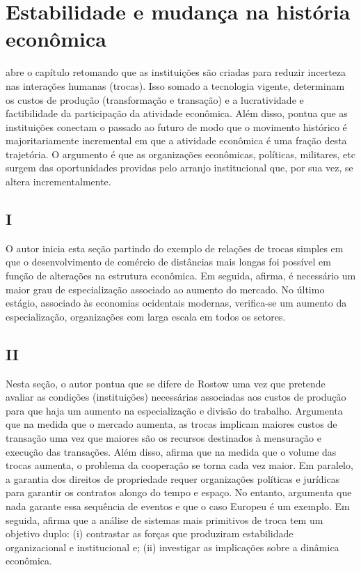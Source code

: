 \section*{Estabilidade e mudança na história econômica}

\autor abre o capítulo retomando que as instituições são criadas para reduzir incerteza nas interações humanas (trocas). Isso somado a tecnologia vigente, determinam os custos de produção (transformação e transação) e a lucratividade e factibilidade da participação da atividade econômica. Além disso, pontua que as instituições conectam o passado ao futuro de modo que o movimento histórico é majoritariamente incremental em que a atividade econômica é uma fração desta trajetória. O argumento é que as organizações econômicas, políticas, militares, etc surgem das oportunidades providas pelo arranjo institucional que, por sua vez, se altera incrementalmente.

\subsection*{I}

O autor inicia esta seção partindo do exemplo de relações de trocas simples em que o desenvolvimento de comércio de distâncias mais longas foi possível em função de alterações na estrutura econômica. Em seguida, afirma, é necessário um maior grau de especialização associado ao aumento do mercado. No último estágio, associado às economias ocidentais modernas, verifica-se um aumento da especialização, organizações com larga escala em todos os setores.

\subsection*{II}

Nesta seção, o autor pontua que se difere de Rostow uma vez que pretende avaliar as condições (instituições) necessárias associadas aos custos de produção para que haja um aumento na especialização e divisão do trabalho. Argumenta que na medida que o mercado aumenta, as trocas implicam maiores custos de transação uma vez que maiores são os recursos destinados à mensuração e execução das transações. Além disso, afirma que na medida que o volume das trocas aumenta, o problema da cooperação se torna cada vez maior. Em paralelo, a garantia dos direitos de propriedade requer organizações políticas e jurídicas para garantir os contratos alongo do tempo e espaço.
No entanto, argumenta que nada garante essa sequência de eventos e que o caso Europeu é um exemplo. Em seguida, afirma que a análise de sistemas mais primitivos de troca tem um objetivo duplo: (i) contrastar as forças que produziram estabilidade organizacional e institucional e; (ii) investigar as implicações sobre a dinâmica econômica.


